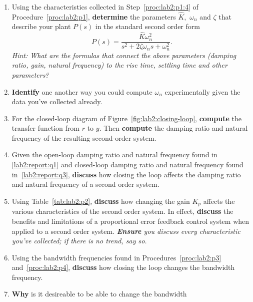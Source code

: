 \begin{deliverable}[label={lab2:report}]
  \begin{enumerate}[label={(\arabic*)}]
    \item{
      Using the characteristics collected in Step~\ref{proc:lab2:p1:4} of
      Procedure~\ref{proc:lab2:p1}, \textbf{determine} the parameters
      \(\hat{K},\) \(\omega_n\) and \(\zeta\) that describe your plant \(P(s)\)
      in the standard second order form
      \[
        P(s) = \frac{\hat{K} \omega_n^2}{s^2 + 2 \zeta \omega_n s + \omega_n^2}
        .
      \]
      \emph{Hint: What are the formulas that connect the above parameters
      (damping ratio, gain, natural frequency) to the rise time, settling time
      and other parameters?}
      \label{lab2:report:q1}
    }
    \item{
      \textbf{Identify} one another way you could compute \(\omega_n\)
      experimentally given the data you've collected already.
      \label{lab2:report:q2}
    }
    \item{
      For the closed-loop diagram of Figure~\ref{fig:lab2:closing-loop},
      \textbf{compute} the transfer function from \(r\) to \(y.\)
      Then \textbf{compute} the damping ratio and natural frequency of the
      resulting second-order system.
      \label{lab2:report:q3}
    }
    \item{
      Given the open-loop damping ratio and natural frequency found in
      \ref{lab2:report:q1} and closed-loop damping ratio and natural
      frequency found in~\ref{lab2:report:q3},
      \textbf{discuss} how closing the loop
      affects the damping ratio and natural frequency of a second order system.
      \label{lab2:report:q4}
    }
    \item{
      Using Table~\ref{tab:lab2:p2}, \textbf{discuss} how changing the
      gain \(K_p\) affects the various characteristics of the second order
      system. In effect, \textbf{discuss} the benefits and limitations of a
      proportional error feedback control system when applied to a second
      order system. \emph{\textbf{Ensure} you discuss every characteristic
      you've collected; if there is no trend, say so.}
      \label{lab2:report:q5}
    }
    \item{
      Using the bandwidth frequencies found in Procedures~\ref{proc:lab2:p3}
      and~\ref{proc:lab2:p4}, \textbf{discuss} how closing the loop
      changes the bandwidth frequency.
      \label{lab2:report:q6}
    }
    \item{
      \textbf{Why} is it desireable to be able to change the bandwidth
}
\end{enumerate}
\end{deliverable}
